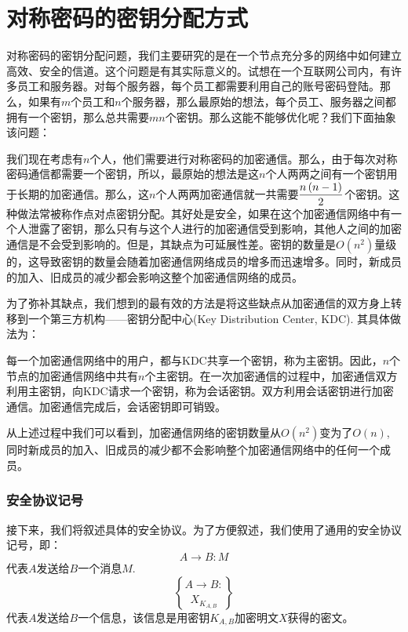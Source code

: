 \section{对称密码的密钥分配方式}
对称密码的密钥分配问题，我们主要研究的是在一个节点充分多的网络中如何建立高效、安全的信道。这个问题是有其实际意义的。试想在一个互联网公司内，有许多员工和服务器。对每个服务器，每个员工都需要利用自己的账号密码登陆。那么，如果有$m$个员工和$n$个服务器，那么最原始的想法，每个员工、服务器之间都拥有一个密钥，那么总共需要$mn$个密钥。那么这能不能够优化呢？我们下面抽象该问题：\par
我们现在考虑有$n$个人，他们需要进行对称密码的加密通信。那么，由于每次对称密码通信都需要一个密钥，所以，最原始的想法是这$n$个人两两之间有一个密钥用于长期的加密通信。那么，这$n$个人两两加密通信就一共需要$\displaystyle\frac{n\left( {n-1}\right)}{2}$个密钥。这种做法常被称作点对点密钥分配。其好处是安全，如果在这个加密通信网络中有一个人泄露了密钥，那么只有与这个人进行的加密通信受到影响，其他人之间的加密通信是不会受到影响的。但是，其缺点为可延展性差。密钥的数量是$O(n^2)$量级的，这导致密钥的数量会随着加密通信网络成员的增多而迅速增多。同时，新成员的加入、旧成员的减少都会影响这整个加密通信网络的成员。\par
为了弥补其缺点，我们想到的最有效的方法是将这些缺点从加密通信的双方身上转移到一个第三方机构——密钥分配中心(Key Distribution Center, KDC). 其具体做法为：\par
每一个加密通信网络中的用户，都与KDC共享一个密钥，称为主密钥。因此，$n$个节点的加密通信网络中共有$n$个主密钥。在一次加密通信的过程中，加密通信双方利用主密钥，向KDC请求一个密钥，称为会话密钥。双方利用会话密钥进行加密通信。加密通信完成后，会话密钥即可销毁。\par
从上述过程中我们可以看到，加密通信网络的密钥数量从$O(n^2)$变为了$O(n)$, 同时新成员的加入、旧成员的减少都不会影响整个加密通信网络中的任何一个成员。
\subsubsection{安全协议记号}
接下来，我们将叙述具体的安全协议。为了方便叙述，我们使用了通用的安全协议记号，即：
\[A\to B: M\]
代表$A$发送给$B$一个消息$M$.
\[A\to B: \brace{X}_{K_{A, B}}\]
代表$A$发送给$B$一个信息，该信息是用密钥$K_{A, B}$加密明文$X$获得的密文。
